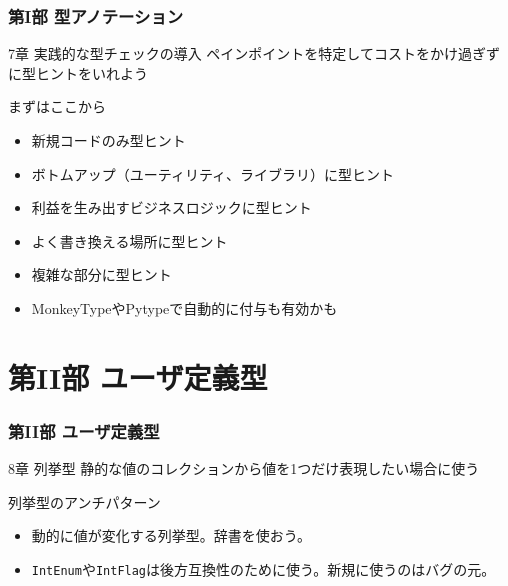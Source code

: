 \documentclass[aspectratio=169,dvipdfmx,12pt,notheorems]{beamer}
\theoremstyle{definition}
\begin{document}
\begin{frame}\frametitle{第I部 型アノテーション}

\begin{block}{7章 実践的な型チェックの導入}
ペインポイントを特定してコストをかけ過ぎずに型ヒントをいれよう
\end{block}

\begin{exampleblock}{まずはここから}
\begin{itemize}
\item 新規コードのみ型ヒント
\item ボトムアップ（ユーティリティ、ライブラリ）に型ヒント
\item 利益を生み出すビジネスロジックに型ヒント
\item よく書き換える場所に型ヒント
\item 複雑な部分に型ヒント
\item MonkeyTypeやPytypeで自動的に付与も有効かも
\end{itemize}
\end{exampleblock}

\end{frame}

\section{第II部 ユーザ定義型}

\begin{frame}\frametitle{第II部 ユーザ定義型}

\begin{block}{8章 列挙型}
静的な値のコレクションから値を1つだけ表現したい場合に使う
\end{block}

\begin{alertblock}{列挙型のアンチパターン}
\begin{itemize}
\item 動的に値が変化する列挙型。辞書を使おう。
\item \texttt{IntEnum}や\texttt{IntFlag}は後方互換性のために使う。新規に使うのはバグの元。
\end{itemize}
\end{alertblock}

\end{frame}
\end{document}
